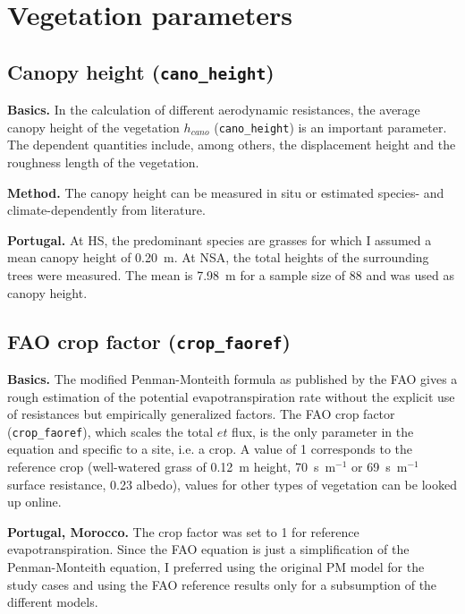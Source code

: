 \documentclass{scrreprt}
\begin{document}
\section{Vegetation parameters} \label{sec:parest_veg}

\subsection{Canopy height (\texttt{cano\_height})} \label{ssec:parest_veg_canoheight}

\textbf{Basics.}
In the calculation of different aerodynamic resistances, the average canopy height of the vegetation $h_{cano}$ (\verb!cano_height!) is an important parameter.
The dependent quantities include, among others, the displacement height and the roughness length of the vegetation.

\textbf{Method.}
The canopy height can be measured in situ or estimated species- and climate-dependently from literature.

\textbf{Portugal.}
At HS, the predominant species are grasses for which I assumed a mean canopy height of 0.20~m.
At NSA, the total heights of the surrounding trees were measured.
The mean is 7.98~m for a sample size of 88 and was used as canopy height.

\subsection{FAO crop factor (\texttt{crop\_faoref})} \label{ssec:parest_veg_cropfaoref}

\textbf{Basics.}
The modified Penman-Monteith formula as published by the FAO \citep{fao98} gives a rough estimation of the potential evapotranspiration rate without the explicit use of resistances but empirically generalized factors.
The FAO crop factor (\verb!crop_faoref!), which scales the total $et$ flux, is the only parameter in the equation and specific to a site, i.e. a crop.
A value of 1 corresponds to the reference crop (well-watered grass of 0.12~m height, 70~s~m$^{-1}$ \citep{fao98} or 69~s~m$^{-1}$ \citep{shuttleworth07} surface resistance, 0.23 albedo), values for other types of vegetation can be looked up online.

\textbf{Portugal, Morocco.}
The crop factor was set to 1 for reference evapotranspiration.
Since the FAO equation is just a simplification of the Penman-Monteith equation, I preferred using the original PM model for the study cases and using the FAO reference results only for a subsumption of the different models.
\end{document}
